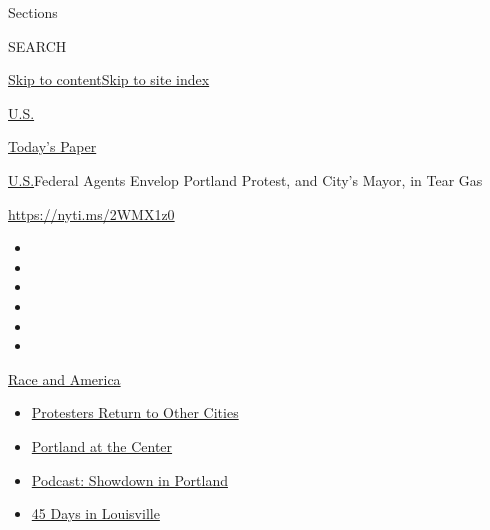 Sections

SEARCH

\protect\hyperlink{site-content}{Skip to
content}\protect\hyperlink{site-index}{Skip to site index}

\href{https://www.nytimes.com/section/us}{U.S.}

\href{https://myaccount.nytimes.com/auth/login?response_type=cookie\&client_id=vi}{}

\href{https://www.nytimes.com/section/todayspaper}{Today's Paper}

\href{/section/us}{U.S.}\textbar{}Federal Agents Envelop Portland
Protest, and City's Mayor, in Tear Gas

\url{https://nyti.ms/2WMX1z0}

\begin{itemize}
\item
\item
\item
\item
\item
\item
\end{itemize}

\href{https://www.nytimes.com/news-event/george-floyd-protests-minneapolis-new-york-los-angeles?action=click\&pgtype=Article\&state=default\&region=TOP_BANNER\&context=storylines_menu}{Race
and America}

\begin{itemize}
\tightlist
\item
  \href{https://www.nytimes.com/2020/07/26/us/protests-portland-seattle-trump.html?action=click\&pgtype=Article\&state=default\&region=TOP_BANNER\&context=storylines_menu}{Protesters
  Return to Other Cities}
\item
  \href{https://www.nytimes.com/2020/07/24/us/portland-oregon-protests-white-race.html?action=click\&pgtype=Article\&state=default\&region=TOP_BANNER\&context=storylines_menu}{Portland
  at the Center}
\item
  \href{https://www.nytimes.com/2020/07/23/podcasts/the-daily/portland-protests.html?action=click\&pgtype=Article\&state=default\&region=TOP_BANNER\&context=storylines_menu}{Podcast:
  Showdown in Portland}
\item
  \href{https://www.nytimes.com/interactive/2020/07/16/us/black-lives-matter-protests-louisville-breonna-taylor.html?action=click\&pgtype=Article\&state=default\&region=TOP_BANNER\&context=storylines_menu}{45
  Days in Louisville}
\end{itemize}

